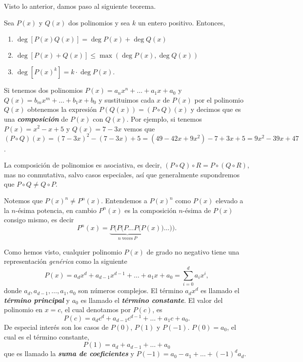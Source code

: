 Visto lo anterior, damos paso al siguiente teorema.
\begin{theorem.tcb}{}{}
    Sea $P(x)$ y $Q(x)$ dos polinomios y sea $k$ un entero positivo.
    Entonces,
    \begin{enumerate}
        \item $\deg [P(x) Q(x)] = \deg P(x) + \deg Q(x)$
        \item $\deg [P(x) + Q(x)] \leq \max (\deg P(x), \deg Q(x))$
        \item $\deg [P(x)^k] = k \cdot \deg P(x)$.
    \end{enumerate}
\end{theorem.tcb}

Si tenemos dos polinomios $P(x) = a_n x^n + \ldots + a_1 x + a_0$ y $Q(x) = b_m x^m + \ldots + b_1 x + b_0$ y sustituimos cada $x$ de $P(x)$ por el polinomio $Q(x)$ obtenemos la expresión $P\left(Q(x)\right) = (P \circ Q)(x)$ y decimos que es una \textbf{\emph{composición}} de $P(x)$ con $Q(x)$.
Por ejemplo, si tenemos $P(x) = x^2 - x + 5$ y $Q(x) = 7 - 3x$ vemos que $(P \circ Q)(x) = (7 - 3x)^2 - (7 - 3x) + 5 = (49 - 42x + 9x^2) - 7 + 3x + 5 = 9x^2 - 39x + 47$.

La composición de polinomios es asociativa, es decir, $(P \circ Q) \circ R = P \circ (Q \circ R)$, mas no conmutativa, salvo casos especiales, así que generalmente supondremos que $P \circ Q \neq  Q \circ P$.

\begin{remark.tcb}
    Notemos que $P(x)^n \neq P^n(x)$.
    Entendemos a $P(x)^n$ como $P(x)$ elevado a la $n$-ésima potencia, en cambio $P^n(x)$ es la composición $n$-ésima de $P(x)$ consigo mismo, es decir
    \[
        P^n(x) = \underbrace{P(P(P\dots P(P}_{n\ \text{veces}\ P} (x))\dots)).
    \]
\end{remark.tcb}


Como hemos visto, cualquier polinomio $P(x)$ de grado no negativo tiene una representación \textit{genérica} como la siguiente
\[
    P(x) = a_d x^d + a_{d - 1} x^{d - 1} + \ldots + a_1 x + a_0 = \sum_{i = 0}^{d} a_i x^i,
\]
donde $a_d, a_{d - 1}, \ldots, a_1, a_0$ son números complejos.
El término $a_d x^d$ es llamado el \textbf{\emph{término principal}} y $a_0$ es llamado el \textbf{\emph{término constante}}.
El valor del polinomio en $x = c$, el cual denotamos por $P(c)$, es
\[
    P(c) = a_d c^d + a_{d - 1}c^{d - 1} + \ldots + a_1 c + a_0.
\]
De especial interés son los casos de $P(0)$, $P(1)$ y $P(-1)$.
    $P(0) = a_0$, el cual es el término constante,
\[
    P(1) = a_d + a_{d - 1} + \ldots + a_0
\]
que es llamado la \textbf{\emph{suma de coeficientes}} y $P(-1) = a_0 - a_1 + \ldots + (-1)^d a_d.$

